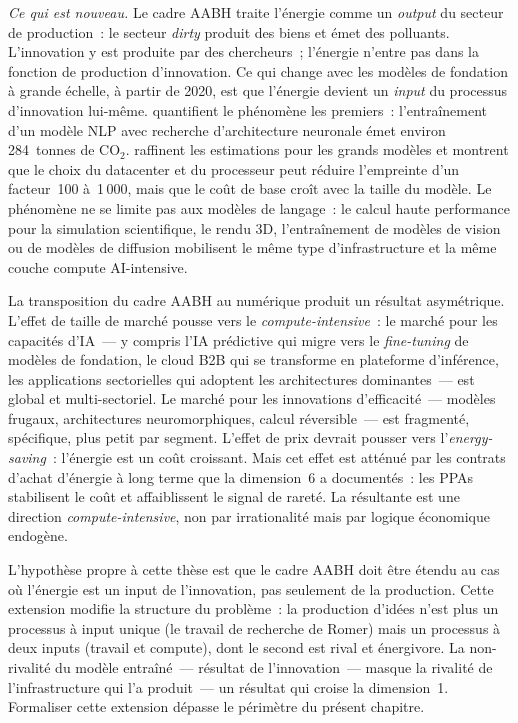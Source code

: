 \emph{Ce qui est nouveau.} Le cadre AABH traite l'énergie comme un \emph{output} du secteur de production~: le secteur \emph{dirty} produit des biens et émet des polluants. L'innovation y est produite par des chercheurs~; l'énergie n'entre pas dans la fonction de production d'innovation. Ce qui change avec les modèles de fondation à grande échelle, à partir de 2020, est que l'énergie devient un \emph{input} du processus d'innovation lui-même. \textcite{strubell_energy_2019} quantifient le phénomène les premiers~: l'entraînement d'un modèle NLP avec recherche d'architecture neuronale émet environ 284~tonnes de CO$_2$. \textcite{patterson_carbon_2021} raffinent les estimations pour les grands modèles et montrent que le choix du datacenter et du processeur peut réduire l'empreinte d'un facteur~100 à~1\,000, mais que le coût de base croît avec la taille du modèle. Le phénomène ne se limite pas aux modèles de langage~: le calcul haute performance pour la simulation scientifique, le rendu 3D, l'entraînement de modèles de vision ou de modèles de diffusion mobilisent le même type d'infrastructure et la même couche compute AI-intensive.

La transposition du cadre AABH au numérique produit un résultat asymétrique. L'effet de taille de marché pousse vers le \emph{compute-intensive}~: le marché pour les capacités d'IA~--- y compris l'IA prédictive qui migre vers le \emph{fine-tuning} de modèles de fondation, le cloud B2B qui se transforme en plateforme d'inférence, les applications sectorielles qui adoptent les architectures dominantes~--- est global et multi-sectoriel. Le marché pour les innovations d'efficacité~--- modèles frugaux, architectures neuromorphiques, calcul réversible~--- est fragmenté, spécifique, plus petit par segment. L'effet de prix devrait pousser vers l'\emph{energy-saving}~: l'énergie est un coût croissant. Mais cet effet est atténué par les contrats d'achat d'énergie à long terme que la dimension~6 a documentés~: les PPAs stabilisent le coût et affaiblissent le signal de rareté. La résultante est une direction \emph{compute-intensive}, non par irrationalité mais par logique économique endogène.

L'hypothèse propre à cette thèse est que le cadre AABH doit être étendu au cas où l'énergie est un input de l'innovation, pas seulement de la production. Cette extension modifie la structure du problème~: la production d'idées n'est plus un processus à input unique (le travail de recherche de Romer) mais un processus à deux inputs (travail et compute), dont le second est rival et énergivore. La non-rivalité du modèle entraîné~--- résultat de l'innovation~--- masque la rivalité de l'infrastructure qui l'a produit~--- un résultat qui croise la dimension~1. Formaliser cette extension dépasse le périmètre du présent chapitre.

